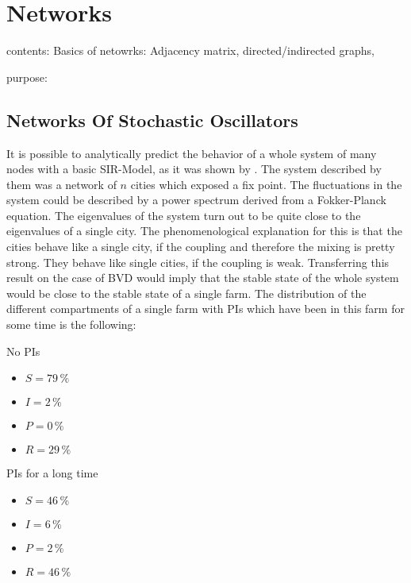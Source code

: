 \section{Networks}\label{chap:networksBasics}
contents: Basics of netowrks: Adjacency matrix, directed/indirected graphs, 

purpose:

\subsection{Networks Of Stochastic Oscillators}
It is possible to analytically predict the behavior of a whole system of many nodes with a basic SIR-Model, as it was shown by \citep{ROZ11}. The system described by them was a network of $n$ cities which exposed a fix point. The fluctuations in the system could be described by a power spectrum derived from a Fokker-Planck equation. The eigenvalues of the system turn out to be quite close to the eigenvalues of a single city. The phenomenological explanation for this is that the cities behave like a single city, if the coupling and therefore the mixing is pretty strong. They behave like single cities, if the coupling is weak. Transferring this result on the case of BVD would imply that the stable state of the whole system would be close to the stable state of a single farm. The distribution of the different compartments of a single farm with PIs which have been in this farm for some time is the following:
\\
\begin{minipage}[t]{0.5\linewidth}
No PIs
    \begin{itemize}
    \item $S= 79\,\%$
\item $I= 2\,\%$
\item $P= 0\,\%$ 
\item $R= 29\,\%$
    \end{itemize}
\end{minipage}
\begin{minipage}[t]{0.5\linewidth}
PIs for a long time
    \begin{itemize}
    \item $S= 46\,\%$
\item $I= 6\,\%$
\item $P= 2\,\%$ 
\item $R= 46\,\%$
    \end{itemize}
\end{minipage}